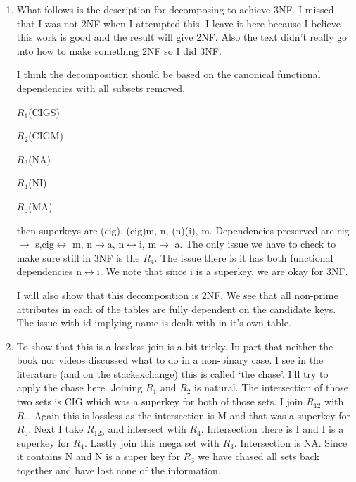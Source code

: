 \documentclass[11pt]{article}
\begin{document}
\begin{enumerate}
\begin{enumerate}
\item What follows is the description for decomposing to achieve 3NF.  I missed that I was not 2NF when I attempted this.  I leave it here because I believe this work is good and the result will give 2NF.  Also the text didn't really go into how to make something 2NF so I did 3NF.  

I think the decomposition should be based on the canonical functional dependencies with all subsets removed.

$R_1$(CIGS)

$R_2$(CIGM)

$R_3$(NA)

$R_4$(NI)

$R_5$(MA)

then superkeys are (cig), (cig)m, n, (n)(i), m.  Dependencies preserved are cig$\rightarrow$ s,cig$\leftrightarrow$ m, n$\rightarrow$a, n$\leftrightarrow$i, m$\rightarrow$ a.  The only issue we have to check to make sure still in 3NF is the $R_4$.  The issue there is it has both functional dependencies n$\leftrightarrow$i.  We note that since i is a superkey, we are okay for 3NF.

I will also show that this decomposition is 2NF.  We see that all non-prime attributes in each of the tables are fully dependent on the candidate keys.  The issue with id implying name is dealt with in it's own table.

\item To show that this is a lossless join is a bit tricky.  In part that neither the book nor videos discussed what to do in a non-binary case.  I see in the literature (and on the \href{https://stackoverflow.com/questions/21560069/lossless-join-decomposition-more-than-two-relations}{stackexchange}) this is called `the chase'.  I'll try to apply the chase here.  Joining $R_1$ and $R_2$ is natural.  The intersection of those two sets is CIG which was a superkey for both of those sets.  I join $R_{12}$ with $R_5$.  Again this is lossless as the intersection is M and that was a superkey for $R_5$.  Next I take $R_{125}$ and intersect wtih $R_4$.  Intersection there is I and I is a superkey for $R_4$.  Lastly join this mega set with $R_3$.  Intersection is NA.  Since it contains N and N is a super key for $R_3$ we have chased all sets back together and have lost none of the information.


\end{enumerate}
\end{enumerate}
\end{document}
